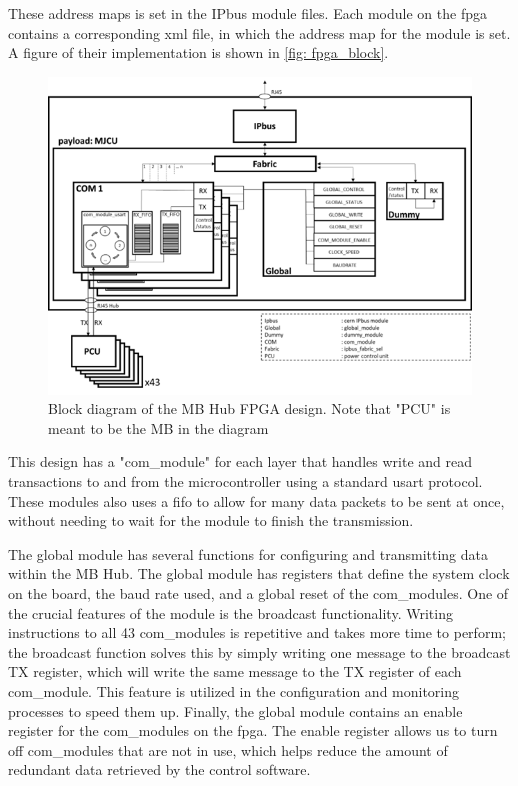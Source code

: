 \documentclass[main.tex]{subfiles}
\begin{document}
These address maps is set in the IPbus module files. Each module on the \gls{fpga} contains a corresponding xml file, in which the address map for the module is set. A figure of their implementation is shown in \autoref{fig: fpga_block}.


\begin{figure}[!htpb]
    \centering
    \includegraphics[width=13cm, scale=1]{images/BlockDiagramFPGA.png}
    \caption{Block diagram of the MB Hub FPGA design. Note that "PCU" is meant to be the MB in the diagram\cite{gutta}}
    \label{fig: fpga_block}
\end{figure}
\FloatBarrier

This design has a "com\_module" for each layer that handles write and read transactions to and from the microcontroller using a standard \gls{usart} protocol. These modules also uses a \gls{fifo} to allow for many data packets to be sent at once, without needing to wait for the module to finish the transmission.

The global module has several functions for configuring and transmitting data within the MB Hub. The global module has registers that define the system clock on the board, the baud rate used, and a global reset of the com\_modules. One of the crucial features of the module is the broadcast functionality. Writing instructions to all 43 com\_modules is repetitive and takes more time to perform; the broadcast function solves this by simply writing one message to the broadcast TX register, which will write the same message to the TX register of each com\_module. This feature is utilized in the configuration and monitoring processes to speed them up. Finally, the global module contains an enable register for the com\_modules on the \gls{fpga}. The enable register allows us to turn off com\_modules that are not in use, which helps reduce the amount of redundant data retrieved by the control software.
\end{document}
